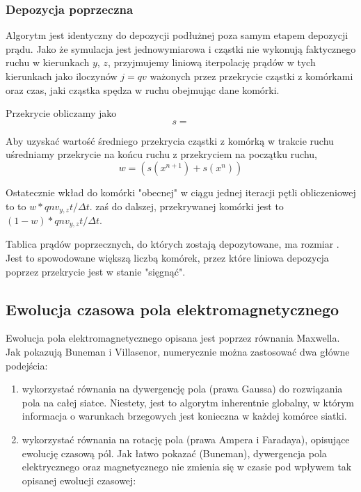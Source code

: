     \subsubsection{Depozycja poprzeczna}
    Algorytm jest identyczny do depozycji podłużnej poza samym etapem depozycji
    prądu. Jako że symulacja jest jednowymiarowa i cząstki nie wykonują
    faktycznego ruchu w kierunkach $y$, $z$, przyjmujemy liniową iterpolację
    prądów w tych kierunkach jako iloczynów $j=qv$ ważonych przez przekrycie
    cząstki z komórkami oraz czas, jaki cząstka spędza w ruchu obejmując dane
    komórki.

    Przekrycie obliczamy jako
    \begin{equation}
        s =
    \end{equation}

    Aby uzyskać wartość średniego przekrycia cząstki z komórką w trakcie ruchu
    uśredniamy przekrycie na końcu ruchu z przekryciem na początku ruchu,
    \begin{equation}
        w = {(s(x^{n+1}) + s(x^n))}
    \end{equation}

    Ostatecznie wkład do komórki "obecnej" w ciągu jednej iteracji pętli obliczeniowej to 
    to $w * q n v_{y, z} t / \Delta t$.
    zaś do dalszej, przekrywanej komórki jest to  $(1-w) * q n v_{y, z} t / \Delta t$.

    Tablica prądów poprzecznych, do których zostają depozytowane, ma rozmiar
    . Jest to spowodowane większą liczbą komórek, przez które liniowa depozycja
    poprzez przekrycie jest w stanie "sięgnąć".



    \subsection{Ewolucja czasowa pola elektromagnetycznego} 

    Ewolucja pola elektromagnetycznego opisana jest poprzez równania Maxwella.
    Jak pokazują Buneman i Villasenor, numerycznie można zastosować dwa główne
    podejścia: 

    \begin{enumerate}
        \item wykorzystać równania na dywergencję pola (prawa Gaussa) do
        rozwiązania pola na całej siatce. Niestety, jest to algorytm
        inherentnie globalny, w którym informacja o warunkach brzegowych
        jest konieczna w każdej komórce siatki.

        \item wykorzystać równania na rotację pola (prawa Ampera i Faradaya),
        opisujące ewolucję czasową pól. Jak łatwo pokazać (Buneman), dywergencja
        pola elektrycznego oraz magnetycznego nie zmienia się w czasie pod
        wpływem tak opisanej ewolucji czasowej:
    \end{enumerate}

